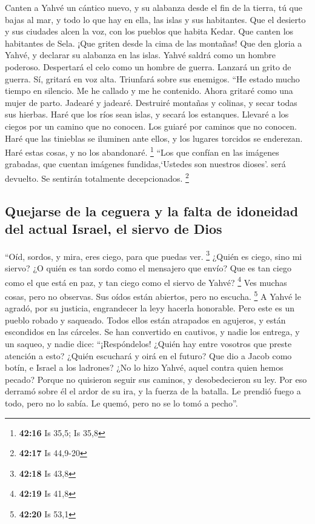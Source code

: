 \begin{paracol}{2}
 Canten a Yahvé un cántico nuevo, y su alabanza desde el
fin de la tierra, tú que bajas al mar, y todo lo que hay en ella, las
islas y sus habitantes.  Que el desierto y sus ciudades
alcen la voz, con los pueblos que habita Kedar. Que canten los
habitantes de Sela. ¡Que griten desde la cima de las montañas!
 Que den gloria a Yahvé, y declarar su alabanza en las
islas.  Yahvé saldrá como un hombre poderoso. Despertará
el celo como un hombre de guerra. Lanzará un grito de guerra. Sí,
gritará en voz alta. Triunfará sobre sus enemigos.  ``He
estado mucho tiempo en silencio. Me he callado y me he contenido. Ahora
gritaré como una mujer de parto. Jadearé y jadearé. 
Destruiré montañas y colinas, y secar todas sus hierbas. Haré que los
ríos sean islas, y secará los estanques.  Llevaré a los
ciegos por un camino que no conocen. Los guiaré por caminos que no
conocen. Haré que las tinieblas se iluminen ante ellos, y los lugares
torcidos se enderezan. Haré estas cosas, y no los abandonaré.
\footnote{\textbf{42:16} Is 35,5; Is 35,8}  ``Los que
confían en las imágenes grabadas, que cuentan imágenes fundidas,`Ustedes
son nuestros dioses'. será devuelto. Se sentirán totalmente
decepcionados. \footnote{\textbf{42:17} Is 44,9-20}

\hypertarget{quejarse-de-la-ceguera-y-la-falta-de-idoneidad-del-actual-israel-el-siervo-de-dios}{%
\subsection{Quejarse de la ceguera y la falta de idoneidad del actual
Israel, el siervo de
Dios}\label{quejarse-de-la-ceguera-y-la-falta-de-idoneidad-del-actual-israel-el-siervo-de-dios}}

 ``Oíd, sordos, y mira, eres ciego, para que puedas ver.
\footnote{\textbf{42:18} Is 43,8}  ¿Quién es ciego, sino
mi siervo? ¿O quién es tan sordo como el mensajero que envío? Que es tan
ciego como el que está en paz, y tan ciego como el siervo de Yahvé?
\footnote{\textbf{42:19} Is 41,8}  Ves muchas cosas, pero
no observas. Sus oídos están abiertos, pero no escucha. \footnote{\textbf{42:20}
  Is 53,1}  A Yahvé le agradó, por su justicia,
engrandecer la leyy hacerla honorable.  Pero este es un
pueblo robado y saqueado. Todos ellos están atrapados en agujeros, y
están escondidos en las cárceles. Se han convertido en cautivos, y nadie
los entrega, y un saqueo, y nadie dice: ``¡Respóndelos! 
¿Quién hay entre vosotros que preste atención a esto? ¿Quién escuchará y
oirá en el futuro?  Que dio a Jacob como botín, e Israel
a los ladrones? ¿No lo hizo Yahvé, aquel contra quien hemos pecado?
Porque no quisieron seguir sus caminos, y desobedecieron su ley.
 Por eso derramó sobre él el ardor de su ira, y la fuerza
de la batalla. Le prendió fuego a todo, pero no lo sabía. Le quemó, pero
no se lo tomó a pecho''.


\end{paracol}
